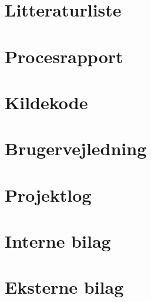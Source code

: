 \documentclass[12pt]{report}
\begin{document}
\chapter{Litteraturliste}

\newpage


\chapter{Procesrapport}



\chapter{Kildekode}




\chapter{Brugervejledning}



\chapter{Projektlog}

\newpage

\chapter{Interne bilag}



\chapter{Eksterne bilag}

\end{document}
